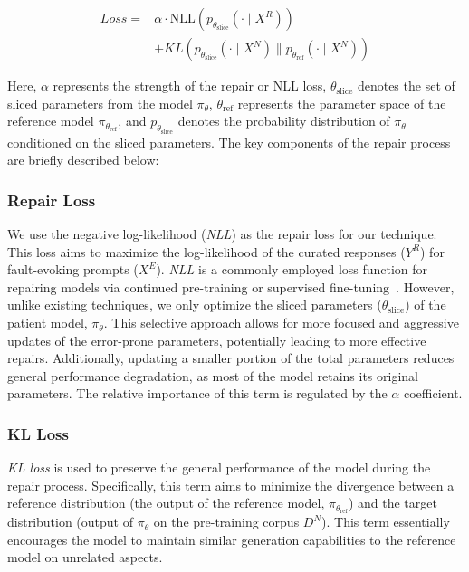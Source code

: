 \begin{equation}
\label{eq:rpob}
\begin{aligned}
Loss = & \alpha \cdot \text{NLL}\left( p_{\theta_{\text{slice}}}(\cdot \mid X^R) \right) \\
& + KL\left( p_{\theta_{\text{slice}}}(\cdot \mid X^N) \parallel p_{\theta_{\text{ref}}}(\cdot \mid X^N) \right)
\end{aligned}
\end{equation}


Here, \( \alpha \) represents the strength of the repair or NLL loss, \( \theta_{\text{slice}} \) denotes the set of sliced parameters from the model \( \pi_\theta \), \( \theta_{\text{ref}} \) represents the parameter space of the reference model \( \pi_{\theta_{\text{ref}}} \), and \( p_{\theta_{\text{slice}}} \) denotes the probability distribution of \( \pi_\theta \) conditioned on the sliced parameters. The key components of the repair process are briefly described below:

\subsubsection{Repair Loss}

We use the negative log-likelihood (\textit{NLL}) as the repair loss for our technique. This loss aims to maximize the log-likelihood of the curated responses (\(Y^R\)) for fault-evoking prompts (\(X^E\)). \textit{NLL} is a commonly employed loss function for repairing models via continued pre-training or supervised fine-tuning~\cite{wang2022exploring, gehman2020realtoxicityprompts, lee2024mechanistic,geva2022transformer}. However, unlike existing techniques, we only optimize the sliced parameters (\(\theta_{\text{slice}}\)) of the patient model, \(\pi_\theta\). This selective approach allows for more focused and aggressive updates of the error-prone parameters, potentially leading to more effective repairs. Additionally, updating a smaller portion of the total parameters reduces general performance degradation, as most of the model retains its original parameters. The relative importance of this term is regulated by the $\alpha$ coefficient. 

\subsubsection{KL Loss}
\textit{KL loss} is used to preserve the general performance of the model during the repair process. Specifically, this term aims to minimize the divergence between a reference distribution (the output of the reference model, $\pi_{\theta_{\text{ref}}}$) and the target distribution (output of $\pi_{\theta}$ on the pre-training corpus \(D^N\)). This term essentially encourages the model to maintain similar generation capabilities to the reference model on unrelated aspects.


